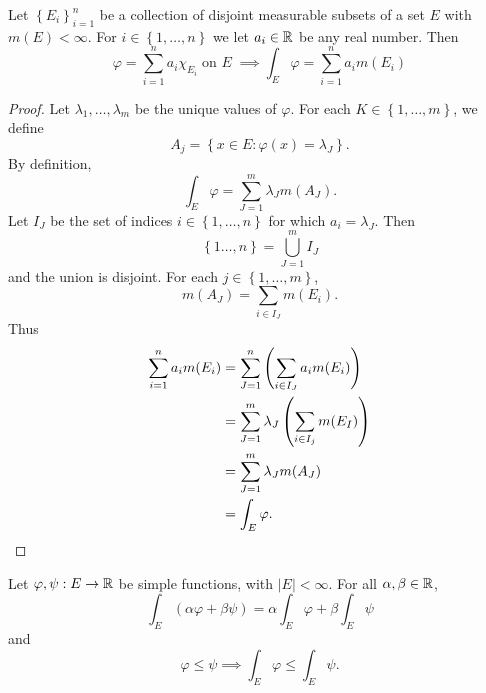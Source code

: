 \begin{lemma}[]
	Let
	$
		\left\{
			E_i
		\right\}_{i=1}^n
	$
	be a collection of disjoint measurable subsets of a set $E$
	with $m(E) < \infty$.
	For $i \in \left\{
		1, \ldots, n
	\right\}$
	we let $a_i \in \mathbb{R}$ be any real number.
	Then
	\[
		\varphi = \sum_{i=1}^n a_i \chi_{E_i} \;\text{on $E$}\; \implies
		\int_E \varphi = \sum_{i=1}^n a_i m(E_i)
	\]
\end{lemma}

\begin{proof}
	Let $\lambda_1, \ldots, \lambda_m$ be the unique values of
	$\varphi$.
	For each $K \in \left\{
		1, \ldots, m
	\right\}$,
	we define \[
		A_j = \left\{
			x \in E: \varphi(x) = \lambda_J
		\right\}.
	\]
	By definition,
	\[
		\int_E \varphi =
		\sum_{J=1}^m \lambda_J m(A_J).
	\]
	Let $I_J$ be the set of indices $i \in \left\{
		1, \ldots, n
	\right\}$
	for which $a_i = \lambda_J$.
	Then
	\[
		\left\{
			1 \ldots, n
		\right\}
		= \bigcup_{J=1}^m I_J
	\]
	and the union is disjoint.
	For each $j \in \left\{
		1, \ldots, m
	\right\}$,
	\[
		m(A_J) = \sum_{i \in I_J} m(E_i).
	\]
	Thus
	\begin{align*}
		\sum_{i=1}^n a_i m(E_i)
		&= \sum_{J=1}^n \left( 
			\sum_{i \in I_J} a_im(E_i) 
		\right) \\
		&= \sum_{J=1}^m \lambda_J \left( 
			\sum_{i\in I_j} m(E_I) 
		\right) \\
		&= \sum_{J=1}^m \lambda_J m(A_J) \\
		&= \int_E \varphi. \qedhere
	\end{align*}
\end{proof}

\begin{proposition}
	Let $\varphi, \psi: E \to \mathbb{R}$ be simple functions,
	with $\left\lvert E \right\rvert < \infty$.
	For all $\alpha, \beta \in \mathbb{R}$,
	\[
		\int_E (\alpha \varphi + \beta \psi)
		= \alpha \int_E \varphi + \beta \int_E \psi
	\]
	and
	\[
		\varphi \leq \psi \implies \int_E \varphi \leq \int_E \psi.
	\]
\end{proposition}

